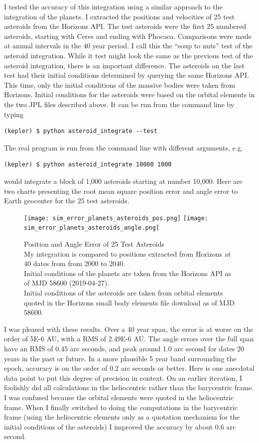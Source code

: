 I tested the accuracy of this integration using a similar approach to the integration of the planets.
I extracted the positions and velocities of 25 test asteroids from the Horizons API.
The test asteroids were the first 25 numbered asteroids, starting with Ceres and ending with Phocaea.
Comparisons were made at annual intervals in the 40 year period.
I call this the ``soup to nuts'' test of the asteroid integration.
While it test might look the same as the previous test of the asteroid integration, there is an important difference.
The asteroids on the last test had their initial conditions determined by querying the same Horizons API.
This time, only the initial conditions of the massive bodies were taken from Horizons.
Initial conditions for the asteroids were based on the orbital elements in the two JPL files described above.
It can be run from the command line by typing
\begin{lstlisting}[style=CodeSnippet]
(kepler) $ python asteroid_integrate --test
\end{lstlisting}
The real program is run from the command line with different arguments, e.g. 
\begin{lstlisting}[style=CodeSnippet]
(kepler) $ python asteroid_integrate 10000 1000
\end{lstlisting}
would integrate a block of 1,000 asteroids starting at number 10,000. 
Here are two charts presenting the root mean square position error and angle error to Earth geocenter for the 25 test asteroids.
\begin{figure}[hbt!]
\begin{center}
\texttt{[image: sim\_error\_planets\_asteroids\_pos.png]}
\texttt{[image: sim\_error\_planets\_asteroids\_angle.png]}
\caption{Position and Angle Error of 25 Test Asteroids\\
My integration is compared to positions extracted from Horizons at 40 dates from from 2000 to 2040.\\
Initial conditions of the planets are taken from the Horizons API as of MJD 58600 (2019-04-27). \\
Initial conditions of the asteroids are taken from orbital elements quoted in the 
Horizons small body elements file download as of MJD 58600.}
\end{center}
\end{figure}
\clearpage

I was pleased with these results.
Over a 40 year span, the error is at worse on the order of 5E-6 AU, with a RMS of 2.49E-6 AU.
The angle errors over the full span have an RMS of 0.45 arc seconds,
and peak around 1.0 arc second for dates 20 years in the past or future.
In a more plausible 5 year band surrounding the epoch, accuracy is on the order of 0.2 arc seconds or better.
Here is one anecdotal data point to put this degree of precision in context.
On an earlier iteration, I foolishly did all calculations in the heliocentric rather than the barycentric frame.
I was confused because the orbital elements were quoted in the heliocentric frame.
When I finally switched to doing the computations in the barycentric frame 
(using the heliocentric elements only as a quotation mechanism for the initial conditions of the asteroids)
I improved the accuracy by about 0.6 arc second.

